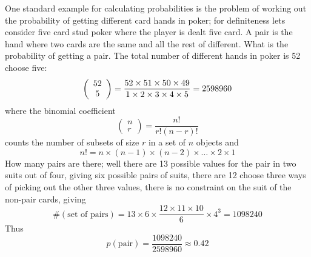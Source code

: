 \documentclass[11pt,a4paper]{scrartcl}
\begin{document}
One standard example for calculating probabilities is the problem of
working out the probability of getting different card hands in poker;
for definiteness lets consider five card stud poker where the player
is dealt five card. A pair is the hand where two cards are the
same and all the rest of different. What is the probability of getting a pair. The total number
of different hands in poker is 52 choose five:
\begin{equation}
\left(\begin{array}{c}52\\5\end{array}\right)=\frac{52\times 51\times 50\times 49\time 48}{1\times 2 \times 3 \times 4\times 5}=2598960
\end{equation}
where the binomial coefficient
\begin{equation}
\left(\begin{array}{c}n\\r\end{array}\right)=\frac{n!}{r!(n-r)!}
\end{equation}
counts the number of subsets of size $r$ in a set of $n$ objects and 
\begin{equation}
n!=n\times (n-1)\times (n-2)\times \ldots \times 2 \times 1
\end{equation}
How many pairs are there; well there are 13 possible values for the
pair in two suits out of four, giving six possible pairs of suits,
there are 12 choose three ways of picking out the other three values,
there is no constraint on the suit of the non-pair cards, giving
\begin{equation}
\#(\mbox{set of pairs})=13\times 6\times \frac{12\times 11\times 10}{6}\times 4^3=1098240
\end{equation}
Thus
\begin{equation}
p(\mbox{pair})=\frac{1098240}{2598960}\approx 0.42
\end{equation}
\end{document}
